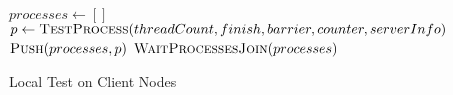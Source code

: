 \begin{algorithm}[ht!]
	\begin{algorithmic}
		\State $processes\gets[]$
		\State $p\gets\Call{TestProcess}{threadCount,finish,barrier,counter,serverInfo}$
		\State $\Call{Push}{processes, p}$
		\EndFor
		\State $\Call{WaitProcessesJoin}{processes}$
		\EndProcedure
	\end{algorithmic}
	\caption{Local Test on Client Nodes}
	\label{algo:testClientMaster}
\end{algorithm}
